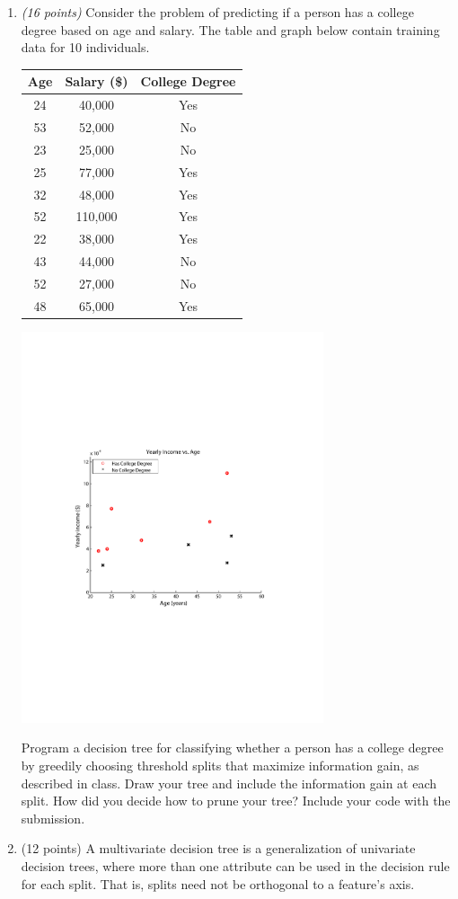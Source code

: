 \documentclass[letterpaper]{article}
\begin{document}
\begin{enumerate}
  \item
  \emph{(16 points)} Consider the problem of predicting if a person has a college degree based on
  	age and salary.  The table and graph below contain training data for 10 individuals.
  	
  \begin{center}
  	\begin{tabular}{|c|c|c|}
  	\hline
  	Age & Salary (\$) & College Degree \\
  	\hline
  	24 & 40,000 & Yes \\
  	53 & 52,000 & No \\
  	23 & 25,000 & No \\
  	25 & 77,000 & Yes \\
  	32 & 48,000 & Yes \\
  	52 & 110,000 & Yes \\
  	22 & 38,000 & Yes \\
  	43 & 44,000 & No \\
  	52 & 27,000 & No \\
  	48 & 65,000 & Yes \\
  	\hline
  	\end{tabular}
   \end{center}
   \begin{center}
   	\includegraphics[width=3.5in]{hw1-decision-tree.pdf}
   \end{center}
   Program a decision tree for classifying whether a person has a college degree by greedily choosing threshold splits that maximize
   information gain, as described in class.  
   Draw your tree and include the information gain at each split. How did you decide how to prune your tree?
   Include your code with the submission.  
  \item{(12 points)}
  	A multivariate decision tree is a generalization of univariate decision trees, where more than one attribute
  	can be used in the decision rule for each split.  That is, splits need not be orthogonal to a feature's axis.
  	

\end{enumerate}
\end{document}
